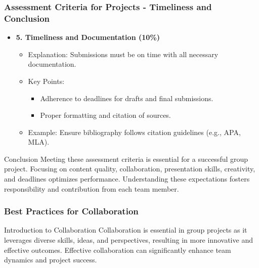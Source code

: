 \documentclass[aspectratio=169]{beamer}
\begin{document}
\begin{frame}[fragile]
    \frametitle{Assessment Criteria for Projects - Timeliness and Conclusion}
    \begin{itemize}
        \item \textbf{5. Timeliness and Documentation (10\%)}
            \begin{itemize}
                \item Explanation: Submissions must be on time with all necessary documentation.
                \item Key Points:
                    \begin{itemize}
                        \item Adherence to deadlines for drafts and final submissions.
                        \item Proper formatting and citation of sources.
                    \end{itemize}
                \item Example: Ensure bibliography follows citation guidelines (e.g., APA, MLA).
            \end{itemize}
    \end{itemize}
    
    \begin{block}{Conclusion}
        Meeting these assessment criteria is essential for a successful group project. Focusing on content quality, collaboration, presentation skills, creativity, and deadlines optimizes performance. Understanding these expectations fosters responsibility and contribution from each team member.
    \end{block}
\end{frame}

\begin{frame}[fragile]
    \frametitle{Best Practices for Collaboration}
    \begin{block}{Introduction to Collaboration}
        Collaboration is essential in group projects as it leverages diverse skills, ideas, and perspectives, resulting in more innovative and effective outcomes.
        Effective collaboration can significantly enhance team dynamics and project success.
    \end{block}
\end{frame}
\end{document}
